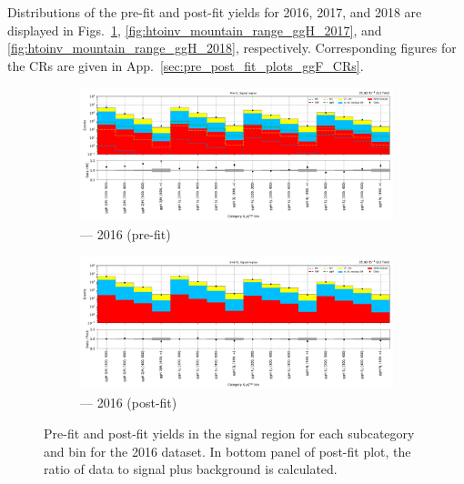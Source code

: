 Distributions of the pre-fit and post-fit yields for 2016, 2017, and 2018 are displayed in Figs.~\ref{fig:htoinv_mountain_range_ggH_2016}, \ref{fig:htoinv_mountain_range_ggH_2017}, and \ref{fig:htoinv_mountain_range_ggH_2018}, respectively. Corresponding figures for the \glspl{CR} are given in App.~\ref{sec:pre_post_fit_plots_ggF_CRs}.

\begin{figure}[htbp]
    \centering
    \begin{subfigure}[b]{0.9\textwidth}
        \includegraphics[width=\textwidth]{figures/mountain_ranges/2016/ggF/SR_tree_prefit-abs_values_ggF_cats.pdf}
        \caption{\ggH --- 2016 (pre-fit)}
    \end{subfigure}

    \begin{subfigure}[b]{0.9\textwidth}
        \includegraphics[width=\textwidth]{figures/mountain_ranges/2016/ggF/SR_tree_fit_s-abs_values_ggF_cats.pdf}
        \caption{\ggH --- 2016 (post-fit)}
    \end{subfigure}
    \caption[Pre-fit and post-fit yields in the signal region for each \ggH subcategory and \ptmiss bin for the 2016 dataset]{Pre-fit and post-fit yields in the signal region for each \ggH subcategory and \ptmiss bin for the 2016 dataset. In bottom panel of post-fit plot, the ratio of data to signal plus background is calculated.}
    \label{fig:htoinv_mountain_range_ggH_2016}
\end{figure}

